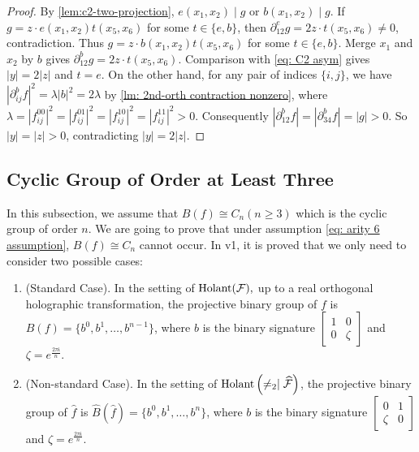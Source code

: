 \begin{proof}
    By \cref{lem:c2-two-projection}, $e(x_1,x_2)\mid g$ or $b(x_1,x_2)\mid g$.
    If $g=z\cdot e(x_1,x_2)t(x_5,x_6)$ for some $t\in \{e,b\}$, then $\partial_{12}^e g=2z\cdot t(x_5,x_6)\neq 0$, contradiction.
    Thus
    $g=z\cdot b(x_1,x_2)t(x_5,x_6)$ for some $t\in\{e,b\}$.  
    Merge $x_1$ and $x_2$ by $b$ gives
    \(
     \partial_{12}^{b}g=2z\cdot t(x_5,x_6).
    \)
    Comparison with \eqref{eq: C2 asym} gives $|y|=2|z|$ and $t=e$.
    On the other hand, for any pair of indices $\{i,j\}$, we have $|\partial_{ij}^bf|^2=\lambda|b|^2=2\lambda$ by \cref{lm: 2nd-orth contraction nonzero}, where $\lambda=|f_{ij}^{00}|^2=|f_{ij}^{01}|^2=|f_{ij}^{10}|^2=|f_{ij}^{11}|^2>0$.
    Consequently $|\partial_{12}^{b}f|=|\partial_{34}^{b}f|=|g|>0$.
    So $|y|=|z|>0$, contradicting $|y|=2|z|$.
\end{proof}

\subsection{Cyclic Group of Order at Least Three}\label{subsec: Cyclic group of Order at least three}
In this subsection, we assume that $B(f)\cong C_n(n\ge 3)$ which is the cyclic group of order $n$.
We are going to prove that under assumption \eqref{eq: arity 6 assumption}, $B(f)\cong C_n$ cannot occur.
In \cite{MingjiProgram} v1, it is proved that we only need to consider two possible cases:
\begin{enumerate}
    \item 
    (Standard Case).
    In the setting of $\operatorname{Holant}(\mathcal{F}),$ up to a real orthogonal holographic transformation, 
    the projective binary group of $f$ is $B(f)=\{b^0, b^1,\ldots,b^{n-1}\}$, where $b$ is the binary signature $\left[\begin{matrix}
        1 & 0\\
        0 & \zeta
    \end{matrix}\right]$ and  $\zeta=e^{\frac{2\pi \mathfrak{i}}{n}}.$
    
    \item 
    (Non-standard Case).
    In the setting of $\operatorname{Holant}\left(\neq_2\mid \widehat{\mathcal{F}}\right)$, the projective binary group of $\widehat{f}$ is $\widehat{B}(\widehat{f})=\{b^0,b^1,\ldots,b^n\}$,
    where $b$ is the binary signature $\left[\begin{matrix}
        0 & 1\\
        \zeta & 0
    \end{matrix}\right]$ and $\zeta=e^{\frac{2\pi \mathfrak{i}}{n}}.$
\end{enumerate}

